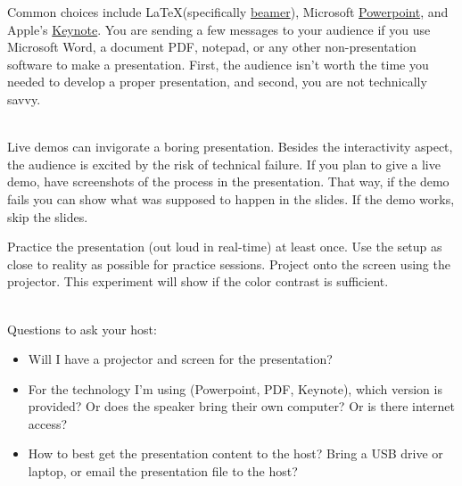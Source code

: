 Common choices include \LaTeX (specifically \href{https://en.wikipedia.org/wiki/Beamer_(LaTeX)}{beamer}), 
\iftoggle{WPinmargin}{\marginpar{[Wikipedia] Beamer}}{}
Microsoft \href{https://en.wikipedia.org/wiki/Microsoft_PowerPoint}{Powerpoint}, 
and Apple's \href{https://en.wikipedia.org/wiki/Keynote_(presentation_software)}{Keynote}. 
You are sending a few messages to your audience if you use Microsoft Word, a document PDF, notepad, or any other non-presentation software to make a presentation.
First, the audience isn't worth the time you needed to develop a proper presentation, and second, you are not technically savvy.

\ \\


Live demos can invigorate a boring presentation. Besides the interactivity aspect, the audience is excited by the risk of technical failure. 
If you plan to give a live demo, have screenshots of the process in the presentation. That way, if the demo fails you can show what was supposed to happen in the slides. If the demo works, skip the slides.


Practice the presentation (out loud in real-time) at least once.
Use the setup as close to reality as possible for practice sessions. Project onto the screen using the projector. This experiment will show if the color contrast is sufficient.

\ \\

Questions to ask your host:
\begin{itemize}
    \item Will I have a projector and screen for the presentation?
    \item For the technology I'm using (Powerpoint, PDF, Keynote), which version is provided? 
    Or does the speaker bring their own computer? 
    Or is there internet access?
    \item How to best get the presentation content to the host? Bring a USB drive or laptop, or email the presentation file to the host?
\end{itemize}


